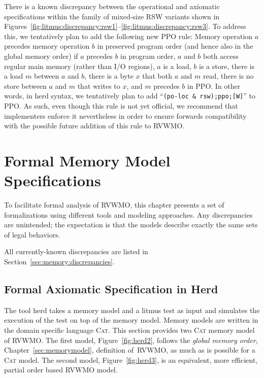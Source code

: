 There is a known discrepancy between the operational and axiomatic specifications within the family of mixed-size RSW variants shown in Figures~\ref{fig:litmus:discrepancy:rsw1}--\ref{fig:litmus:discrepancy:rsw3}.
To address this, we tentatively plan to add the following new PPO rule:
Memory operation $a$ precedes memory operation $b$ in preserved program order (and hence also in the global memory order) if $a$ precedes $b$ in program order, $a$ and $b$ both access regular main memory (rather than I/O regions), $a$ is a load, $b$ is a store, there is a load $m$ between $a$ and $b$, there is a byte $x$ that both $a$ and $m$ read, there is no store between $a$ and $m$ that writes to $x$, and $m$ precedes $b$ in PPO.
In other words, in {\sf herd} syntax, we tentatively plan to add ``{\tt (po-loc \& rsw);ppo;[W]}'' to PPO.
As such, even though this rule is not yet official, we recommend that implementers enforce it nevertheless in order to ensure forwards compatibility with the possible future addition of this rule to RVWMO.

\chapter{Formal Memory Model Specifications}

To facilitate formal analysis of RVWMO, this chapter presents a set of formalizations using different tools and modeling approaches.  Any discrepancies are unintended; the expectation is that the models describe exactly the same sets of legal behaviors.

All currently-known discrepancies are listed in Section~\ref{sec:memory:discrepancies}.

\clearpage


\clearpage
\section{Formal Axiomatic Specification in Herd}
\label{sec:herd}

The tool \textsf{herd} takes a memory model and a litmus test as input and simulates the execution of the test on top of the memory model. Memory models are written in the domain specific language \textsc{Cat}. This section provides two \textsc{Cat} memory model of RVWMO. The first model, Figure~\ref{fig:herd2}, follows the \emph{global memory order}, Chapter~\ref{sec:memorymodel}, definition of~RVWMO, as much as is possible for a \textsc{Cat} model. The second model, Figure~\ref{fig:herd3}, is an equivalent, more efficient, partial order based RVWMO model.

